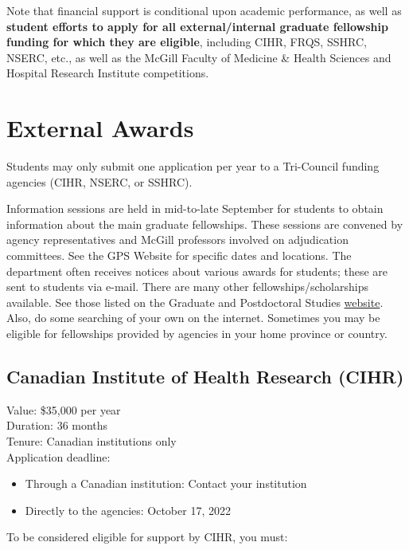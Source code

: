 \documentclass[
  openany]{book}
\providecommand{\tightlist}{%
  \setlength{\itemsep}{0pt}\setlength{\parskip}{0pt}}
\begin{document}
Note that financial support is conditional upon academic performance, as well as \textbf{student efforts to apply for all external/internal graduate fellowship funding for which they are eligible}, including CIHR, FRQS, SSHRC, NSERC, etc., as well as the McGill Faculty of Medicine \& Health Sciences and Hospital Research Institute competitions.

\hypertarget{external-awards}{%
\section{External Awards}\label{external-awards}}

Students may only submit one application per year to a Tri-Council funding agencies (CIHR, NSERC, or SSHRC).

Information sessions are held in mid-to-late September for students to obtain information about the main graduate fellowships. These sessions are convened by agency representatives and McGill professors involved on adjudication committees. See the GPS Website for specific dates and locations. The department often receives notices about various awards for students; these are sent to students via e-mail. There are many other fellowships/scholarships available. See those listed on the Graduate and Postdoctoral Studies \href{www.mcgill.ca/gps/students/fellowships}{website}. Also, do some searching of your own on the internet. Sometimes you may be eligible for fellowships provided by agencies in your home province or country.

\hypertarget{canadian-institute-of-health-research-cihr}{%
\subsection{Canadian Institute of Health Research (CIHR)}\label{canadian-institute-of-health-research-cihr}}

Value: \$35,000 per year\\
Duration: 36 months\\
Tenure: Canadian institutions only\\
Application deadline:

\begin{itemize}
\tightlist
\item
  Through a Canadian institution: Contact your institution
\item
  Directly to the agencies: October 17, 2022
\end{itemize}

To be considered eligible for support by CIHR, you must:
\end{document}
